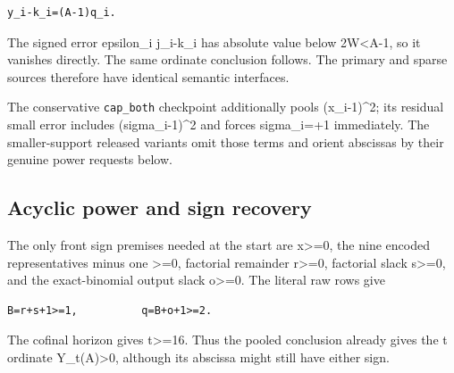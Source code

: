 \begin{verbatim}
y_i-k_i=(A-1)q_i.
\end{verbatim}

The signed error epsilon\_\allowbreak{}i j\_\allowbreak{}i-k\_\allowbreak{}i has absolute value below 2W\textless{}\allowbreak{}A-1, so it vanishes directly. The same ordinate conclusion follows. The primary and sparse sources therefore have identical semantic interfaces.



The conservative \texttt{cap\_\allowbreak{}both} checkpoint additionally pools (x\_\allowbreak{}i-1)\textasciicircum{}\allowbreak{}2; its residual small error includes (sigma\_\allowbreak{}i-1)\textasciicircum{}\allowbreak{}2 and forces sigma\_\allowbreak{}i=\allowbreak{}+\allowbreak{}1 immediately. The smaller-support released variants omit those terms and orient abscissas by their genuine power requests below.



\subsection{Acyclic power and sign recovery}



The only front sign premises needed at the start are x\textgreater{}\allowbreak{}=\allowbreak{}0, the nine encoded representatives minus one \textgreater{}\allowbreak{}=\allowbreak{}0, factorial remainder r\textgreater{}\allowbreak{}=\allowbreak{}0, factorial slack s\textgreater{}\allowbreak{}=\allowbreak{}0, and the exact-binomial output slack o\textgreater{}\allowbreak{}=\allowbreak{}0. The literal raw rows give



\begin{verbatim}
B=r+s+1>=1,          q=B+o+1>=2.
\end{verbatim}

The cofinal horizon gives t\textgreater{}\allowbreak{}=\allowbreak{}16. Thus the pooled conclusion already gives the t ordinate Y\_\allowbreak{}t(A)\textgreater{}\allowbreak{}0, although its abscissa might still have either sign.



